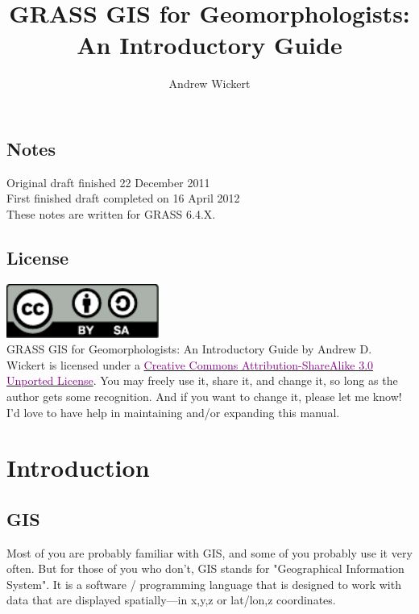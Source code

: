 \documentclass{book}
\title{GRASS GIS for Geomorphologists:\\An Introductory Guide}
\author{Andrew Wickert}
\begin{document}
\maketitle

\tableofcontents
\listofboxxs

\section*{Notes}

\noindent Original draft finished 22 December 2011 \\

\noindent First finished draft completed on 16 April 2012 \\

\noindent These notes are written for GRASS 6.4.X. \\

\section*{License}

\includegraphics[width=5cm]{figures/license/CC-BY-SA_icon.pdf} \\
GRASS GIS for Geomorphologists: An Introductory Guide by Andrew D. Wickert is licensed under a \href{http://creativecommons.org/licenses/by-sa/3.0/}{\textcolor{purple}{Creative Commons Attribution-ShareAlike 3.0 Unported License}}. You may freely use it, share it, and change it, so long as the author gets some recognition. And if you want to change it, please let me know! I'd love to have help in maintaining and/or expanding this manual.

\chapter{Introduction}

\section{GIS}

Most of you are probably familiar with GIS, and some of you probably use it very often. But for those of you who don't, GIS stands for "Geographical Information System". It is a software / programming language that is designed to work with data that are displayed spatially---in x,y,z or lat/lon,z coordinates.
\end{document}
